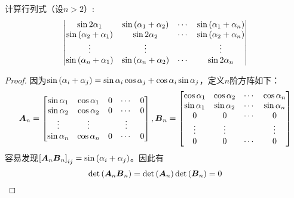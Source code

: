 \begin{problem}
计算行列式（设\(n>2\)）:
\begin{equation*}
    \begin{vmatrix}
        \sin 2\alpha_1                   & \sin\left( \alpha_{1}+\alpha_{2} \right) & \cdots & \sin\left( \alpha_{1}+\alpha_{n} \right) \\
        \sin\left( \alpha_{2}+\alpha_{1} \right) & \sin 2\alpha_2                   & \cdots & \sin\left( \alpha_{2}+\alpha_{n} \right) \\
        \vdots                           & \vdots                           &        & \vdots                           \\
        \sin\left( \alpha_{n}+\alpha_{1} \right) & \sin\left( \alpha_{n}+\alpha_{2} \right) & \cdots & \sin 2\alpha_n
    \end{vmatrix}
\end{equation*}
\end{problem}
\begin{proof}
    因为\(\sin\left( \alpha_i+\alpha_j \right)=\sin\alpha_i\cos\alpha_j+\cos\alpha_i\sin\alpha_j\)，定义\(n\)阶方阵如下：
    \begin{equation*}
        \boldsymbol{A}_n=
        \begin{bmatrix}
            \sin\alpha_{1} & \cos\alpha_{1} & 0 & \cdots & 0 \\
            \sin\alpha_{2} & \cos\alpha_{2} & 0 & \cdots & 0 \\
            \vdots         & \vdots         &   & \vdots     \\
            \sin\alpha_{n} & \cos\alpha_{n} & 0 & \cdots & 0
        \end{bmatrix},
        \boldsymbol{B}_n=
        \begin{bmatrix}
            \cos\alpha_{1} & \cos\alpha_{2} & \cdots & \cos\alpha_{n} \\
            \sin\alpha_{1} & \sin\alpha_{2} & \cdots & \sin\alpha_{n} \\
            0              & 0              & \cdots & 0              \\
            \vdots         & \vdots         &        & \vdots         \\
            0              & 0              & \cdots & 0
        \end{bmatrix}
    \end{equation*}
    容易发现\(\left[ \boldsymbol{A}_n\boldsymbol{B}_n \right]_{ij}=\sin\left( \alpha_i+\alpha_j \right)\)。因此有
    \begin{equation*}
        \mathrm{det}\left( \boldsymbol{A}_n\boldsymbol{B}_n \right)=\mathrm{det}\left( \boldsymbol{A}_n \right)\mathrm{det}\left( \boldsymbol{B}_n \right)=0
    \end{equation*}
\end{proof}

